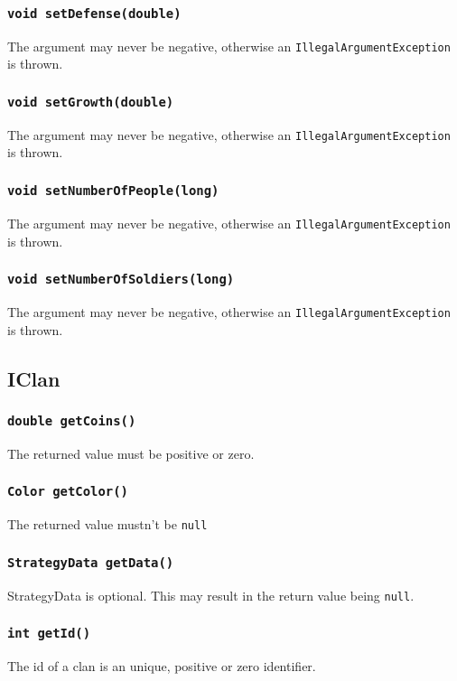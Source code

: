 \documentclass{article}
\begin{document}
\subsubsection{\texttt{void setDefense(double)}}
The argument may never be negative, otherwise an \texttt{IllegalArgumentException} is thrown.

\subsubsection{\texttt{void setGrowth(double)}}
The argument may never be negative, otherwise an \texttt{IllegalArgumentException} is thrown.

\subsubsection{\texttt{void setNumberOfPeople(long)}}
The argument may never be negative, otherwise an \texttt{IllegalArgumentException} is thrown.

\subsubsection{\texttt{void setNumberOfSoldiers(long)}}
The argument may never be negative, otherwise an \texttt{IllegalArgumentException} is thrown.

\subsection{IClan}

\subsubsection{\texttt{double getCoins()}}
The returned value must be positive or zero.

\subsubsection{\texttt{Color getColor()}}
The returned value mustn't be \texttt{null}

\subsubsection{\texttt{StrategyData getData()}}
StrategyData is optional. This may result in the return value being \texttt{null}.

\subsubsection{\texttt{int getId()}}
The id of a clan is an unique, positive or zero identifier.
\end{document}
